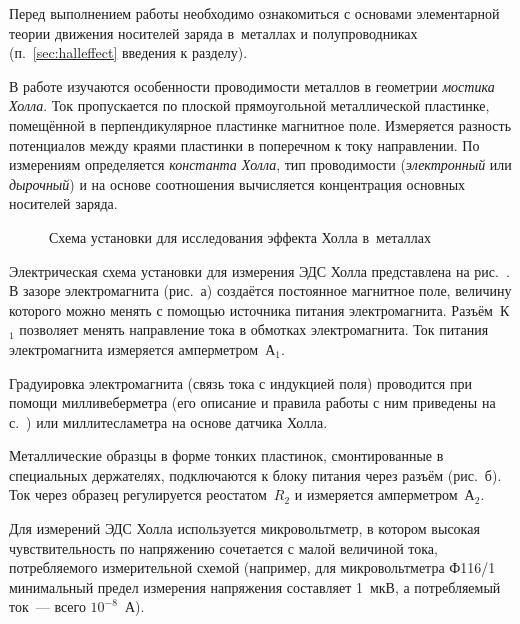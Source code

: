 


Перед выполнением работы необходимо ознакомиться с основами
элементарной теории движения носителей заряда в~металлах и полупроводниках
(п.~\ref{sec:halleffect} введения к разделу).

В работе изучаются особенности проводимости металлов
в геометрии \emph{мостика Холла}.
Ток пропускается по плоской прямоугольной металлической пластинке, 
помещённой в перпендикулярное пластинке магнитное поле.
Измеряется разность потенциалов между краями пластинки в поперечном
к току направлении. По измерениям определяется \emph{константа Холла},
тип проводимости (\emph{электронный} или \emph{дырочный}) и на основе
соотношения  вычисляется концентрация основных
носителей заряда.

\begin{figure}[h!]
    \centering
    \caption{Схема установки для исследования эффекта Холла в~металлах}
\end{figure}

\experiment 

Электрическая схема установки для измерения ЭДС Холла представлена
на рис.~.
В зазоре электромагнита (рис.~а) создаётся постоянное магнитное
поле, величину которого можно менять с помощью источника питания электромагнита.
Разъём~К$_1$ позволяет менять направление тока в обмотках электромагнита. Ток
питания электромагнита измеряется амперметром~А$_1$.

Градуировка электромагнита (связь тока с индукцией поля) проводится 
при помощи милливеберметра (его описание и правила работы 
с ним приведены на с.~\pageref{MWB}) или миллитесламетра на основе
датчика Холла.

Металлические образцы в форме тонких пластинок, смонтированные в специальных
держателях, подключаются к блоку питания через разъём (рис.~б).
Ток через образец регулируется реостатом~$R_2$ и измеряется амперметром~А$_2$.

Для измерений ЭДС Холла используется микровольтметр, в котором
высокая чувствительность по напряжению сочетается с малой величиной тока,
потребляемого измерительной схемой
(например, для микровольтметра Ф116/1 минимальный предел измерения 
напряжения составляет 1~мкВ, а потребляемый ток~--- всего $10^{-8}$~А).

